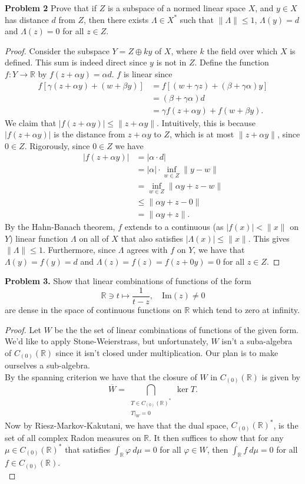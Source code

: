 \documentclass[11pt,letterpaper]{report}
\newcommand{\reals}{\mathbb{R}}
\begin{document}
\noindent\textbf{Problem 2}
Prove that if $Z$ is a subspace of a normed linear space $X$, and $y\in X$ has distance $d$ from $Z$, then there exists $\Lambda\in X^*$ such that $\|\Lambda\|\leq 1$, $\Lambda(y) = d$ and $\Lambda(z) =0$ for all $z\in Z$.
\begin{proof}
	Consider the subspace $Y = Z\oplus ky$ of $X$, where $k$ the field over which $X$ is defined. This sum is indeed direct since $y$ is not in $Z$. Define the function $f: Y\to \reals$ by $f(z + \alpha y) = \alpha d$. $f$ is linear since
	\begin{align*}
		f[\gamma(z+\alpha y) + (w + \beta y)] &= f[(w+\gamma z) + (\beta+\gamma\alpha)y]\\
		&= (\beta+\gamma\alpha)d\\
		&= \gamma f(z+\alpha y) + f(w+\beta y).
	\end{align*}
	We claim that $|f(z+\alpha y)|\leq \|z+\alpha y\|$. Intuitively, this is because $|f(z+\alpha y)|$ is the distance from $z+\alpha y$ to $Z$, which is at most $\|z+\alpha y\|$, since $0\in Z$. Rigorously, since $0\in Z$ we have
	\begin{align*}
		|f(z+\alpha y)| &= |\alpha\cdot d|\\
		&= |\alpha|\cdot \inf_{w\in Z}\|y - w\|\\
		&= \inf_{w\in Z}\|\alpha y + z - w\|\\
		&\leq \|\alpha y+z - 0\|\\
		&= \|\alpha y + z\|.
	\end{align*}
	By the Hahn-Banach theorem, $f$ extends to a continuous (as $|f(x)|<\|x\|$ on $Y$) linear function $\Lambda$ on all of $X$ that also satisfies $|\Lambda(x)|\leq \|x\|$. This gives $\|\Lambda\|\leq 1$. Furthermore, since $\Lambda$ agrees with $f$ on $Y$, we have that $\Lambda(y) = f(y) = d$ and $\Lambda(z) = f(z) = f(z+0y) = 0$ for all $z\in Z$.
\end{proof}

\noindent\textbf{Problem 3. }
Show that linear combinations of functions of the form
\[
\reals \ni t\mapsto \frac{1}{t-z},\quad \text{Im}(z)\neq 0
\]
are dense in the space of continuous functions on $\reals$ which tend to zero at infinity.
\begin{proof}
	Let $W$ be the the set of linear combinations of functions of the given form. We'd like to apply Stone-Weierstrass, but unfortunately, $W$ isn't a suba-algebra of $C_{(0)}(\reals)$ since it isn't closed under multiplication. Our plan is to make ourselves a sub-algebra.\\
	By the spanning criterion we have that the closure of $W$ in $C_{(0)}(\reals)$ is given by
	\[
	\overline{W} = \bigcap_{\substack{T\in C_{(0)}(\reals)^*\\T|_{W} = 0}} \ker T.
	\]
	Now by Riesz-Markov-Kakutani, we have that the dual space, $C_{(0)}(\reals)^*$, is the set of all complex Radon measures on $\reals$. It then suffices to show that for any $\mu \in C_{(0)}(\reals)^*$ that satisfies $\int_\reals \varphi\ d\mu = 0$ for all $\varphi\in W$, then $\int_\reals f\ d\mu = 0$ for all $f\in C_{(0)}(\reals)$.\\
	


\end{proof}
\end{document}
